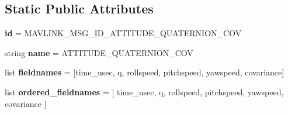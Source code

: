 \subsection*{Static Public Attributes}
\begin{DoxyCompactItemize}
\item 
\mbox{\label{classpymavlink_1_1dialects_1_1v10_1_1MAVLink__attitude__quaternion__cov__message_a156c0c9783320ef5bdd9041083263ddf}} 
{\bfseries id} = M\+A\+V\+L\+I\+N\+K\+\_\+\+M\+S\+G\+\_\+\+I\+D\+\_\+\+A\+T\+T\+I\+T\+U\+D\+E\+\_\+\+Q\+U\+A\+T\+E\+R\+N\+I\+O\+N\+\_\+\+C\+OV
\item 
\mbox{\label{classpymavlink_1_1dialects_1_1v10_1_1MAVLink__attitude__quaternion__cov__message_addd87228d0b6f281e9a919595841479e}} 
string {\bfseries name} = \textquotesingle{}A\+T\+T\+I\+T\+U\+D\+E\+\_\+\+Q\+U\+A\+T\+E\+R\+N\+I\+O\+N\+\_\+\+C\+OV\textquotesingle{}
\item 
\mbox{\label{classpymavlink_1_1dialects_1_1v10_1_1MAVLink__attitude__quaternion__cov__message_a267bc95af36292cc77f2a4cef1d3184a}} 
list {\bfseries fieldnames} = \mbox{[}\textquotesingle{}time\+\_\+usec\textquotesingle{}, \textquotesingle{}q\textquotesingle{}, \textquotesingle{}rollspeed\textquotesingle{}, \textquotesingle{}pitchspeed\textquotesingle{}, \textquotesingle{}yawspeed\textquotesingle{}, \textquotesingle{}covariance\textquotesingle{}\mbox{]}
\item 
\mbox{\label{classpymavlink_1_1dialects_1_1v10_1_1MAVLink__attitude__quaternion__cov__message_a755f0602b56b2d2d31e8636297d7f9ea}} 
list {\bfseries ordered\+\_\+fieldnames} = \mbox{[} \textquotesingle{}time\+\_\+usec\textquotesingle{}, \textquotesingle{}q\textquotesingle{}, \textquotesingle{}rollspeed\textquotesingle{}, \textquotesingle{}pitchspeed\textquotesingle{}, \textquotesingle{}yawspeed\textquotesingle{}, \textquotesingle{}covariance\textquotesingle{} \mbox{]}
\item 
\mbox{\label{classpymavlink_1_1dialects_1_1v10_1_1MAVLink__attitude__quaternion__cov__message_af6b185df94015cc21ae918dc9262d114}} 

\end{DoxyCompactItemize}
